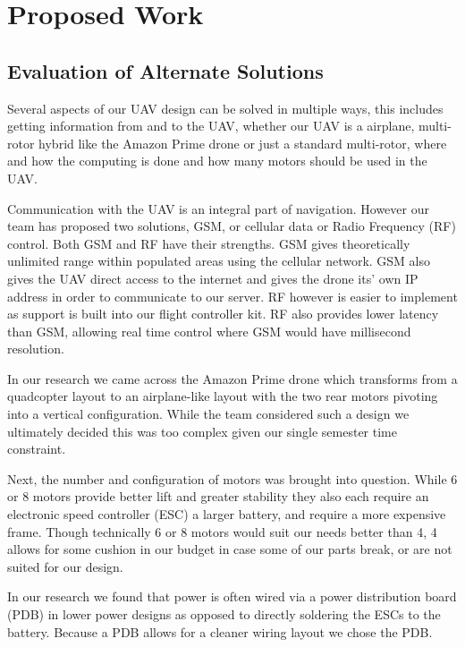 \documentclass[12pt]{extarticle}
\begin{document}
\section{Proposed Work}

\subsection{Evaluation of Alternate Solutions}

Several aspects of our UAV design can be solved in multiple ways, this includes getting information from and to the UAV, whether our UAV is a airplane, multi-rotor hybrid like the Amazon Prime drone or just a standard multi-rotor, where and how the computing is done and how many motors should be used in the UAV.

Communication with the UAV is an integral part of navigation. However our team has proposed two solutions, GSM, or cellular data or Radio Frequency (RF) control. Both GSM and RF have their strengths. GSM gives theoretically unlimited range within populated areas using the cellular network. GSM also gives the UAV direct access to the internet and gives the drone its’ own IP address in order to communicate to our server. RF however is easier to implement as support is built into our flight controller kit. RF also provides lower latency than GSM, allowing real time control where GSM would have millisecond resolution.

In our research we came across the Amazon Prime drone which transforms from a quadcopter layout to an airplane-like layout with the two rear motors pivoting into a vertical configuration. While the team considered such a design we ultimately decided this was too complex given our single semester time constraint.

Next, the number and configuration of motors was brought into question. While 6 or 8 motors provide better lift and greater stability they also each require an electronic speed controller (ESC) a larger battery, and require a more expensive frame. Though technically 6 or 8 motors would suit our needs better than 4, 4 allows for some cushion in our budget in case some of our parts break, or are not suited for our design.

In our research we found that power is often wired via a power distribution board (PDB) in lower power designs as opposed to directly soldering the ESCs to the battery. Because a PDB allows for a cleaner wiring layout we chose the PDB.
\end{document}
